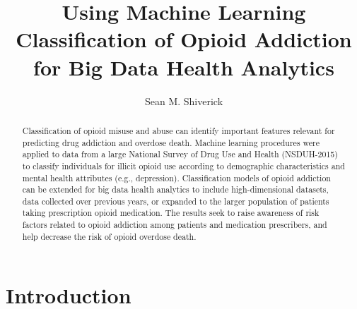 \documentclass[sigconf]{acmart}
\begin{document}
\title{Using Machine Learning Classification of Opioid Addiction
for Big Data Health Analytics}

  \author{Sean M. Shiverick}

\renewcommand{\shortauthors}{S.M. Shiverick}


\begin{abstract}
Classification of opioid misuse and abuse can identify important features 
relevant for predicting drug addiction and overdose death. Machine learning 
procedures were applied to data from a large National Survey of Drug Use and 
Health (NSDUH-2015) to classify individuals for illicit opioid use according 
to demographic characteristics and mental health attributes (e.g., depression). 
Classification models of opioid addiction can be extended for big data health 
analytics to include high-dimensional datasets, data collected over previous 
years, or expanded to the larger population of patients taking prescription 
opioid medication. The results seek to raise awareness of risk factors related 
to opioid addiction among patients and medication prescribers, and help 
decrease the risk of opioid overdose death. 
\end{abstract}


\maketitle

\section{Introduction}
\end{document}
